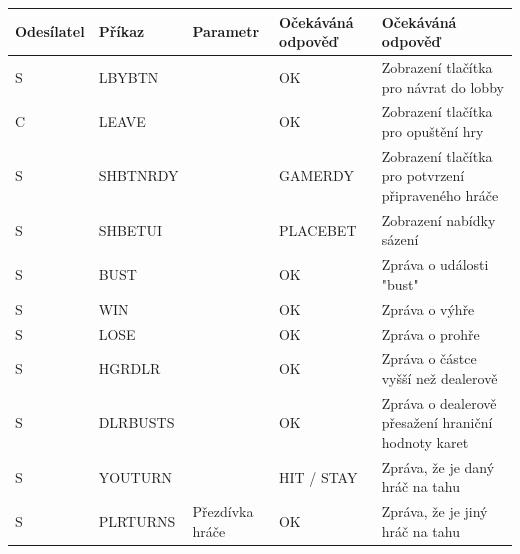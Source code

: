\documentclass[12pt]{article}
\begin{document}
\begin{table}[]
\begin{tabular}{|l|l|l|p{5.5cm}|p{3cm}|}
\hline
\textbf{Odesílatel} & \textbf{Příkaz} & \textbf{Paramet}r        & \textbf{Očekáváná odpověď} & \textbf{Očekáváná odpověď                                                            } \\ \hline
S          & LBYBTN          &                 & OK                                                                & Zobrazení tlačítka pro návrat do lobby              \\ \hline
C          & LEAVE           &                 & OK                                                                & Zobrazení tlačítka pro opuštění hry                 \\ \hline
S          & SHBTNRDY        &                 & GAMERDY                                                           & Zobrazení tlačítka pro potvrzení připraveného hráče \\ \hline
S          & SHBETUI         &                 & PLACEBET                                                          & Zobrazení nabídky sázení                            \\ \hline
S          & BUST            &                 & OK                                                                & Zpráva o události "bust"                            \\ \hline
S          & WIN             &                 & OK                                                                & Zpráva o výhře                                      \\ \hline
S          & LOSE            &                 & OK                                                                & Zpráva o prohře                                     \\ \hline
S          & HGRDLR          &                 & OK                                                                & Zpráva o částce vyšší než dealerově                 \\ \hline
S          & DLRBUSTS        &                 & OK                                                                & Zpráva o dealerově přesažení hraniční hodnoty karet \\ \hline
S          & YOUTURN         &                 & HIT / STAY                                                        & Zpráva, že je daný hráč na tahu                     \\ \hline
S          & PLRTURNS        & Přezdívka hráče & OK                                                                & Zpráva, že je jiný hráč na tahu                     \\ \hline

\end{tabular}
\end{table}
\end{document}
